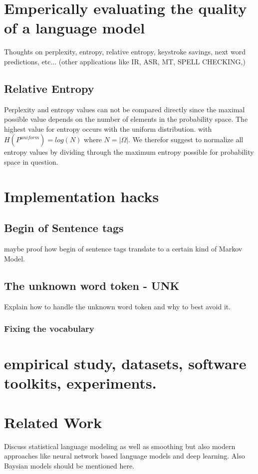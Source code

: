 \documentclass[•]{book}
\begin{document}
\chapter{Emperically evaluating the quality of a language model}
Thoughts on perplexity, entropy, relative entropy, keystroke savings, next word predictions, etc... (other applications like IR, ASR, MT, SPELL CHECKING,) 

\section{Relative Entropy}
Perplexity and entropy values can not be compared directly since the maximal possible value depends on the number of elements in the probability space.
The highest value for entropy occurs with the uniform distribution. with $H(P^{uniform})=log(N)$ where $N = |\Omega|$. 
We therefor suggest to normalize all entropy values by dividing through the maximum entropy possible for probability space in question. 

\chapter{Implementation hacks}
\section{Begin of Sentence tags}
maybe proof how begin of sentence tags translate to a certain kind of Markov Model. 
\section{The unknown word token - UNK}
Explain how to handle the unknown word token and why to best avoid it. 
\subsection{Fixing the vocabulary}

\chapter{empirical study, datasets, software toolkits, experiments.} 


\chapter{Related Work}
Discuss statistical language modeling as well as smoothing but also modern approaches like neural network based language models and deep learning. Also Baysian models should be mentioned here.
\end{document}

